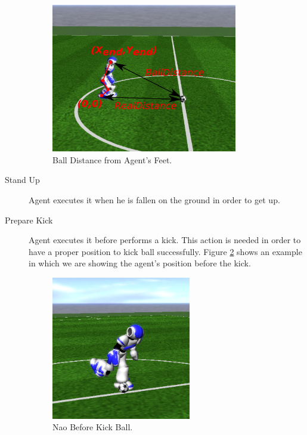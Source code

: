 \begin{description}
 \begin{figure}[!h]
\centering
  \includegraphics[trim=0cm 4cm 0cm 4cm, clip,width=0.8\textwidth]{Chapter3/figures/2dkinematics.pdf}
  \caption{Ball Distance from Agent's Feet.}
  \label{fig:2dkinematics}
\end{figure}
 \item[Stand Up] Agent executes it when he is fallen on the ground in order to get up.
 \item[Prepare Kick] Agent executes it before performs a kick. This action is needed in order to have a proper position to kick ball successfully. Figure \ref{fig:NaoKick} shows an example in which we are showing the agent's position before the kick.
  \begin{figure}[!h]
\centering
  \includegraphics[trim=0cm 3cm 0cm 4cm, clip,width=0.6\textwidth]{Chapter3/figures/NaoKick.png}
  \caption{Nao Before Kick Ball.}
  \label{fig:NaoKick}
\end{figure}
\end{description}

